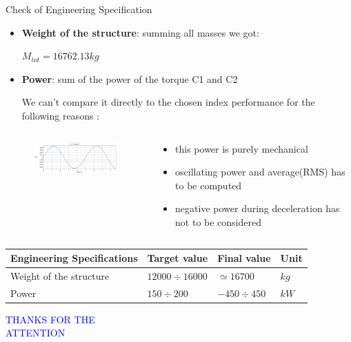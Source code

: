 \documentclass{beamer}              %
\begin{document}
	\begin{frame}{Check of Engineering Specification}
		\footnotesize		
		\begin{itemize}
			\item \textbf{Weight of the structure}: summing all masses we got: \\
			\begin{center}
				$M_{tot}=16762.13kg$
			\end{center}	
			
			\smallskip
			
			\item \textbf{Power}: sum of the power of the torque C1 and C2
			
			\medskip
			
			We can't compare it directly to the chosen index performance for the following reasons :
		\end{itemize}		
		\begin{columns}
			\begin{column}{0.5\textwidth}
				\begin{figure}
					\includegraphics[width=150pt]{grafici/power.png}
				\end{figure}
			\end{column}
	     	\begin{column}{0.5\textwidth}			 
			 \begin{itemize}
			 	\item this power is purely mechanical
			 	\item oscillating power and average(RMS) has to be computed
			 	\item negative power during deceleration has not to be considered
			 \end{itemize}
	    	\end{column}
		\end{columns}
	
		\medskip
		
		\begin{center}
			\begin{tabular}{p{4 cm} p{2 cm} p{1.8 cm} p{0.5 cm} }
				\toprule
				\textbf{Engineering Specifications} &\textbf{Target value} &\textbf{Final value} & \textbf{Unit} \\
				\toprule							
				\centering Weight of the structure & $12000\div16000$ & $\simeq16700$ & $kg$ \\
				\midrule
				\centering Power & $150\div200$ & $-450\div450$ & $kW$ \\
				\bottomrule
			\end{tabular}
		\end{center}
	\end{frame}
	\begin{frame}{}
		\centering \textcolor{blue}{{\Huge  THANKS FOR THE \\
			\vspace{1cm} 
			ATTENTION }}
	\end{frame}
\end{document}
